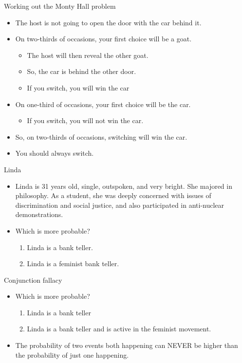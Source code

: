 \documentclass{beamer}
\begin{document}
\begin{frame}{Working out the Monty Hall problem}
\begin{itemize}
\item The host is not going to open the door with the car behind it.
\item On two-thirds of occasions, your first choice will be a goat.
\begin{itemize}
\item The host will then reveal the other goat.
\item So, the car is behind the other door.
\item If you switch, you will win the car
\end{itemize}
\item On one-third of occasions, your first choice will be the car.
\begin{itemize}
\item If you switch, you will not win the car.
\end{itemize}
\item So, on two-thirds of occasions, switching will win the car.
\item You should always switch.
\end{itemize}
\end{frame}

\begin{frame}{Linda}
\begin{itemize}
\item Linda is 31 years old, single, outspoken, and very bright. She majored in philosophy. As a student, she was deeply concerned with issues of discrimination and social justice, and also participated in anti-nuclear demonstrations.
\item Which is more probable?
\begin{enumerate}
\item Linda is a bank teller.
\item Linda is a feminist bank teller.
\end{enumerate}
\end{itemize}
\end{frame}

\begin{frame}{Conjunction fallacy}
\begin{itemize}
\item Which is more probable?
\begin{enumerate}
\item Linda is a bank teller
\item Linda is a bank teller and is active in the feminist movement.
\end{enumerate}
\item The probability of two events both happening can NEVER be higher than the probability of just one happening. 
\end{itemize}
\end{frame}
\end{document}
